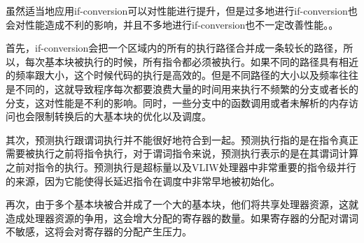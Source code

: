 虽然适当地应用if-conversion可以对性能进行提升，但是过多地进行if-conversion也会对性能造成不利的影响，并且不多地进行if-conversion也不一定改善性能。\cite{ScottA.Mahlke1992}\cite{Tian2010}。

首先，if-conversion会把一个区域内的所有的执行路径合并成一条较长的路径，所以，每次基本块被执行的时候，所有指令都必须被执行。如果不同的路径具有相近的频率跟大小，这个时候代码的执行是高效的。但是不同路径的大小以及频率往往是不同的，这就导致程序每次都要浪费大量的时间用来执行不频繁的分支或者长的分支，这对性能是不利的影响。同时，一些分支中的函数调用或者未解析的内存访问也会限制转换后的大基本块的优化以及调度。

其次，预测执行跟谓词执行并不能很好地符合到一起。预测执行指的是在指令真正需要被执行之前将指令执行，对于谓词指令来说，预测执行表示的是在其谓词计算之前对指令的执行。预测执行是超标量以及VLIW处理器中非常重要的指令级并行的来源，因为它能使得长延迟指令在调度中非常早地被初始化。

再次，由于多个基本块被合并成了一个大的基本块，他们将共享处理器资源，这就造成处理器资源的争用，这会增大分配的寄存器的数量。如果寄存器的分配对谓词不敏感，这将会对寄存器的分配产生压力\cite{Quinones2006}\cite{Quinones2007}。